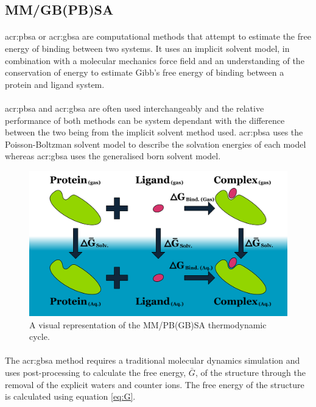 \subsection{MM/GB(PB)SA}\label{subsection:pbsa-theory}
    \paragraph{}
        \gls{acr:pbsa}\cite{Kollman2000CalculatingModels} or \gls{acr:gbsa} are computational methods that attempt to estimate the free energy of binding between two systems. It uses an implicit solvent model, in combination with a molecular mechanics force field and an understanding of the conservation of energy to estimate Gibb's free energy of binding between a protein and ligand system.

    \paragraph{}
        \gls{acr:pbsa} and \gls{acr:gbsa} are often used interchangeably and the relative performance of both methods can be system dependant with the difference between the two being from the implicit solvent method used. \gls{acr:pbsa} uses the Poisson-Boltzman solvent model to describe the solvation energies of each model whereas \gls{acr:gbsa} uses the generalised born solvent model.
        
\begin{figure}[H]
    \centering
    \includegraphics[width=\textwidth]{Graphics/Theory/gbsa.pdf}
    \caption{A visual representation of the MM/PB(GB)SA thermodynamic cycle.}
    \label{fig:mmpbsa}
\end{figure}

    \paragraph{}
        The \gls{acr:gbsa} method requires a traditional molecular dynamics simulation and uses post-processing to calculate the free energy, $\bar{G}$, of the structure through the removal of the explicit waters and counter ions.  The free energy of the structure is calculated using equation \ref{eq:G}.

